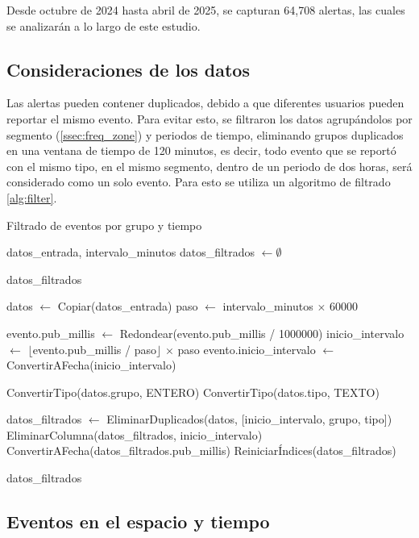 \documentclass[12pt]{article}
\begin{document}
Desde octubre de 2024 hasta abril de 2025, se capturan 64,708 alertas, las cuales se analizarán a lo largo de este estudio.

\subsection{Consideraciones de los datos}

Las alertas pueden contener duplicados, debido a que diferentes usuarios pueden reportar el mismo evento. Para evitar esto, se filtraron los datos agrupándolos por segmento (\cref{ssec:freq_zone}) y periodos de tiempo, eliminando grupos duplicados en una ventana de tiempo de 120 minutos, es decir, todo evento que se reportó con el mismo tipo, en el mismo segmento, dentro de un periodo de dos horas, será considerado como un solo evento. Para esto se utiliza un algoritmo de filtrado \cref{alg:filter}.

\begin{algorithm}
\caption{Filtrado de eventos por grupo y tiempo}
\label{alg:filter}
\begin{algorithmic}[1]
\Require datos\_entrada, intervalo\_minutos
\State datos\_filtrados $\gets \emptyset$

    \Return datos\_filtrados
\EndIf

\State datos $\gets$ Copiar(datos\_entrada)
\State paso $\gets$ intervalo\_minutos $\times$ 60000 

        \State evento.pub\_millis $\gets$ Redondear(evento.pub\_millis / 1000000)
    \EndIf
    \State inicio\_intervalo $\gets$ $\lfloor$evento.pub\_millis / paso$\rfloor$ $\times$ paso
    \State evento.inicio\_intervalo $\gets$ ConvertirAFecha(inicio\_intervalo)
\EndFor

\State ConvertirTipo(datos.grupo, ENTERO)
\State ConvertirTipo(datos.tipo, TEXTO)

\State datos\_filtrados $\gets$ EliminarDuplicados(datos, [inicio\_intervalo, grupo, tipo])
\State EliminarColumna(datos\_filtrados, inicio\_intervalo)
\State ConvertirAFecha(datos\_filtrados.pub\_millis)
\State ReiniciarÍndices(datos\_filtrados)

\Return datos\_filtrados
\end{algorithmic}
\end{algorithm}


\subsection{Eventos en el espacio y tiempo}
\end{document}
